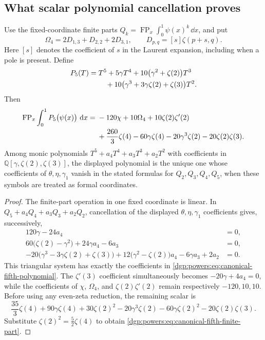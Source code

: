 \subsection{What scalar polynomial cancellation proves}
\label{dgp:subsec:canonical}

\begin{corollary}
\label{dgp:powers:cor:canonical-fifth}
Use the fixed-coordinate finite parts
\(Q_k=\operatorname{FP}_x\int_0^1\psi(x)^k\,\dd x\), and put
\[
 \Omega_4=2D_{1,3}+D_{2,2}+2D_{3,1},
 \qquad D_{p,q}=[s]\zeta(p+s,q).
\]
Here \([s]\) denotes the coefficient of \(s\) in the Laurent
expansion, including when a pole is present. Define
\begin{align}
 P_5(T)={}&T^5+5\gamma T^4
      +10\bigl(\gamma^2+\zeta(2)\bigr)T^3\notag\\
 &\quad+10\bigl(\gamma^3+3\gamma\zeta(2)+\zeta(3)\bigr)T^2.
 \label{dgp:powers:eq:canonical-fifth-polynomial}
\end{align}
Then
\begin{align}
 \operatorname{FP}_x\int_0^1P_5\bigl(\psi(x)\bigr)\,\,\mathrm d x
 ={}&-120\chi+10\Omega_4+10\zeta(2)\zeta'(2)\notag\\
 &+\frac{260}{3}\zeta(4)-60\gamma\zeta(4)
      -20\gamma^3\zeta(2)-20\zeta(2)\zeta(3).
 \label{dgp:powers:eq:canonical-fifth-finite-part}
\end{align}
Among monic polynomials
\(T^5+a_4T^4+a_3T^3+a_2T^2\) with coefficients in
\(\mathbb Q[\gamma,\zeta(2),\zeta(3)]\), the displayed polynomial is
the unique one whose coefficients of \(\theta,\eta,\gamma_1\)
vanish in the stated formulas for \(Q_2,Q_3,Q_4,Q_5\), when these
symbols are treated as formal coordinates.
\end{corollary}

\begin{proof}
The finite-part operation in one fixed coordinate is linear. In
\(Q_5+a_4Q_4+a_3Q_3+a_2Q_2\), cancellation of the displayed
\(\theta,\eta,\gamma_1\) coefficients gives, successively,
\begin{align*}
 120\gamma-24a_4&=0,\\
 60\bigl(\zeta(2)-\gamma^2\bigr)+24\gamma a_4-6a_3&=0,\\
 -20\bigl(\gamma^3-3\gamma\zeta(2)+\zeta(3)\bigr)
 +12\bigl(\gamma^2-\zeta(2)\bigr)a_4-6\gamma a_3+2a_2&=0.
\end{align*}
This triangular system has exactly the coefficients in
\eqref{dgp:powers:eq:canonical-fifth-polynomial}. The
\(\zeta'(3)\) coefficient simultaneously becomes
\(-20\gamma+4a_4=0\), while the coefficients of \(\chi\),
\(\Omega_4\), and \(\zeta(2)\zeta'(2)\) remain respectively
\(-120,10,10\). Before using any even-zeta reduction, the remaining
scalar is
\[
 \frac{35}{3}\zeta(4)+90\gamma\zeta(4)+30\zeta(2)^2
 -20\gamma^3\zeta(2)-60\gamma\zeta(2)^2
 -20\zeta(2)\zeta(3).
\]
Substitute \(\zeta(2)^2=\tfrac52\zeta(4)\) to obtain
\eqref{dgp:powers:eq:canonical-fifth-finite-part}.
\end{proof}

